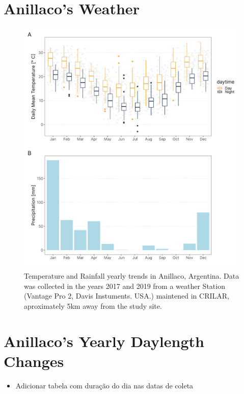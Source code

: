 \documentclass[english,msc,numbers,hidelinks]{coppe}
\providecommand{\tightlist}{%
  \setlength{\itemsep}{0pt}\setlength{\parskip}{0pt}}
\begin{document}
  \hypertarget{anillacos-weather}{%
  \chapter{Anillaco's Weather}\label{anillacos-weather}}
  \begin{figure}

  {\centering \includegraphics[width=1\linewidth]{../04_figures/appendix/plot_weather} 

  }

  \caption{Temperature  and Rainfall yearly trends in Anillaco, Argentina. Data was collected in the years 2017 and 2019 from a weather Station (Vantage Pro 2, Davis Instuments. USA.) maintened in CRILAR, aproximately 5km away from the study site.}\label{fig:appendix-weather}
  \end{figure}
  \hypertarget{anillacos-yearly-daylength-changes}{%
  \chapter{Anillaco's Yearly Daylength Changes}\label{anillacos-yearly-daylength-changes}}
  \begin{itemize}
  \tightlist
  \item
    Adicionar tabela com duração do dia nas datas de coleta
  \end{itemize}
\end{document}

